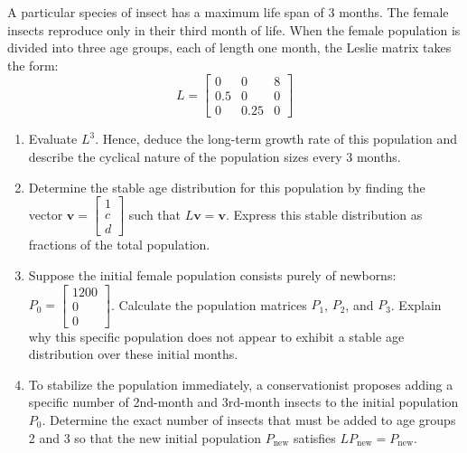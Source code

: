 \begin{problem}
A particular species of insect has a maximum life span of 3 months. The female insects reproduce only in their third month of life. When the female population is divided into three age groups, each of length one month, the Leslie matrix takes the form:
$$L = \begin{bmatrix} 0 & 0 & 8 \\ 0.5 & 0 & 0 \\ 0 & 0.25 & 0 \end{bmatrix}$$

\begin{enumerate}[label=\textbf{(\alph*)}]
    \item Evaluate $L^3$. Hence, deduce the long-term growth rate of this population and describe the cyclical nature of the population sizes every 3 months.
    \item Determine the stable age distribution for this population by finding the vector $\mathbf{v} = \begin{bmatrix} 1 \\ c \\ d \end{bmatrix}$ such that $L\mathbf{v} = \mathbf{v}$. Express this stable distribution as fractions of the total population.
    \item Suppose the initial female population consists purely of newborns: $P_0 = \begin{bmatrix} 1200 \\ 0 \\ 0 \end{bmatrix}$. Calculate the population matrices $P_1$, $P_2$, and $P_3$. Explain why this specific population does not appear to exhibit a stable age distribution over these initial months.
    \item To stabilize the population immediately, a conservationist proposes adding a specific number of 2nd-month and 3rd-month insects to the initial population $P_0$. Determine the exact number of insects that must be added to age groups 2 and 3 so that the new initial population $P_{\text{new}}$ satisfies $L P_{\text{new}} = P_{\text{new}}$.
\end{enumerate}
\end{problem}

